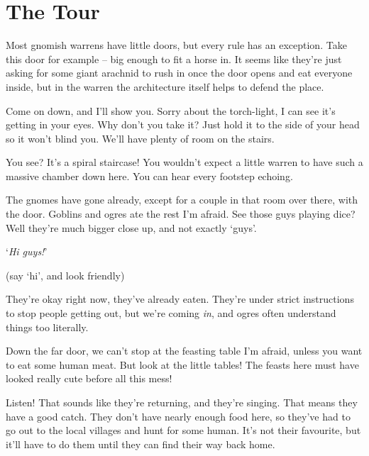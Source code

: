 \chapter{The Tour}

\begin{multicols}{2}
\setcounter{age}{0}

\begin{exampletext}
\noindent
Most gnomish warrens have little doors, but every rule has an exception.
Take this door for example -- big enough to fit a horse in.
It seems like they're just asking for some giant arachnid to rush in once the door opens and eat everyone inside, but in the \gls{warren} the architecture itself helps to defend the place.

Come on down, and I'll show you.
Sorry about the torch-light, I can see it's getting in your eyes.
Why don't you take it?
Just hold it to the side of your head so it won't blind you.
We'll have plenty of room on the stairs.

You see?
It's a spiral staircase!
You wouldn't expect a little warren to have such a massive chamber down here.
You can hear every footstep echoing.


The gnomes have gone already, except for a couple in that room over there, with the door.
Goblins and ogres ate the rest I'm afraid.
See those guys playing dice?
Well they're much bigger close up, and not exactly `guys'.

`\textit{Hi guys!}'

(say `hi', and look friendly)

They're okay right now, they've already eaten.
They're under strict instructions to stop people getting out, but we're coming \textit{in}, and ogres often understand things too literally.

Down the far door, we can't stop at the feasting table I'm afraid, unless you want to eat some human meat.
But look at the little tables!
The feasts here must have looked really cute before all this mess!

Listen!
That sounds like they're returning, and they're singing.
That means they have a good catch.
They don't have nearly enough food here, so they've had to go out to the local \glspl{village} and hunt for some human.
It's not their favourite, but it'll have to do them until they can find their way back home.


\end{exampletext}
\end{multicols}

